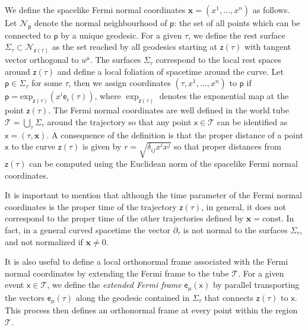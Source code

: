 \documentclass[letterpaper,12pt,titlepage,oneside,final]{book}
\newcommand{\mf}{\mathsf}%
\begin{document}
We define the spacelike Fermi normal coordinates \mbox{$\bm x=(x^1,...,x^n)$} as follows. Let $\mathcal{N}_\mf{p}$ denote the normal neighbourhood of $\mf p$: the set of all points which can be connected to $\mf p$ by a unique geodesic. For a given $\tau$, we define the rest surface $\Sigma_\tau\subset\mathcal{N}_{\mf z(\tau)}$ as the set reached by all geodesics starting at $\mf z(\tau)$ with tangent vector orthogonal to $u^\mu$. The surfaces $\Sigma_\tau$ correspond to the local rest spaces around $\mf z (\tau)$ and define a local foliation of spacetime around the curve. Let $\mf p\in\Sigma_\tau$ for some $\tau$, then we assign coordinates $(\tau,x^1,...,x^n)$ to $\mf p$ if $\mf p = \text{exp}_{\mf z(\tau)}(x^i\mf e_i(\tau))$, where $\exp_{\mf z(\tau)}$ denotes the exponential map at the point $\mf z(\tau)$. The Fermi normal coordinates are well defined in the world tube $\mathcal{T} = \bigcup_\tau \Sigma_\tau$ around the trajectory so that any point $\mf x\in \mathcal{T}$ can be identified as $\mf x = (\tau,\bm x)$. A consequence of the definition is that the proper distance of a point $\mf x$ to the curve $\mf z(\tau)$ is given by $r = \sqrt{\delta_{ij}x^ix^j}$ so that proper distances from $\mf z(\tau)$ can be computed using the Euclidean norm of the spacelike Fermi normal coordinates. 

It is important to mention that although the time parameter of the Fermi normal coordinates is the proper time of the trajectory $\mf z (\tau)$, in general, it does not correspond to the proper time of the other trajectories defined by $\bm x = \text{const.}$ In fact, in a general curved spacetime the vector $\partial_\tau$ is not normal to the surfaces $\Sigma_\tau$, and not normalized if $\bm x \neq 0$.

It is also useful to define a local orthonormal frame associated with the Fermi normal coordinates by extending the Fermi frame to the tube $\mathcal{T}$. For a given event \mbox{$\mf x \in {\mathcal{T}}$}, we define the \emph{extended Fermi frame} $\mf e_\mu(\mf x)$ by parallel transporting the vectors $\mf e_\mu(\tau)$ along the geodesic contained in $\Sigma_\tau$ that connects $\mf z(\tau)$ to $\mf x$. This process then defines an orthonormal frame at every point within the region $\mathcal{T}$.
\end{document}
